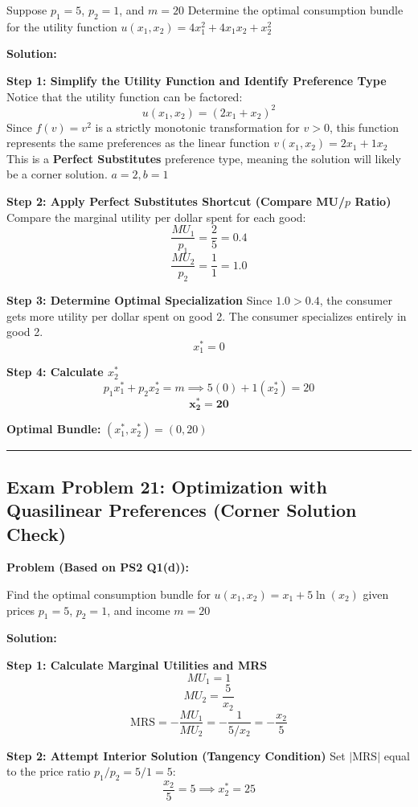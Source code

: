 \documentclass{article}
\begin{document}
Suppose $p_1 = 5$, $p_2 = 1$, and $m = 20$ Determine the optimal consumption bundle for the utility function $u(x_1, x_2) = 4x_1^2 + 4x_1x_2 + x_2^2$

\textbf{Solution:}

\textbf{Step 1: Simplify the Utility Function and Identify Preference Type}
Notice that the utility function can be factored:
\[ u(x_1, x_2) = (2x_1 + x_2)^2 \]
Since $f(v) = v^2$ is a strictly monotonic transformation for $v > 0$, this function represents the same preferences as the linear function $v(x_1, x_2) = 2x_1 + 1x_2$ This is a \textbf{Perfect Substitutes} preference type, meaning the solution will likely be a corner solution. $a=2, b=1$

\textbf{Step 2: Apply Perfect Substitutes Shortcut (Compare MU/$p$ Ratio)}
Compare the marginal utility per dollar spent for each good:
\[ \frac{MU_1}{p_1} = \frac{2}{5} = 0.4 \]
\[ \frac{MU_2}{p_2} = \frac{1}{1} = 1.0 \]

\textbf{Step 3: Determine Optimal Specialization}
Since $1.0 > 0.4$, the consumer gets more utility per dollar spent on good 2. The consumer specializes entirely in good 2.
\[ x_1^* = 0 \]

\textbf{Step 4: Calculate $x_2^*$}
\[ p_1 x_1^* + p_2 x_2^* = m \implies 5(0) + 1(x_2^*) = 20 \]
\[ \boldsymbol{x_2^* = 20} \]

\textbf{Optimal Bundle:} $(x_1^*, x_2^*) = (0, 20)$

\bigskip\noindent\rule{\linewidth}{0.4pt}\bigskip

\subsection*{\textbf{Exam Problem 21: Optimization with Quasilinear Preferences (Corner Solution Check)}}

\textbf{Problem (Based on PS2 Q1(d)):}

Find the optimal consumption bundle for $u(x_1, x_2) = x_1 + 5 \ln(x_2)$ given prices $p_1=5$, $p_2=1$, and income $m=20$

\textbf{Solution:}

\textbf{Step 1: Calculate Marginal Utilities and MRS}
\[ MU_1 = 1 \]
\[ MU_2 = \frac{5}{x_2} \]
\[ \text{MRS} = -\frac{MU_1}{MU_2} = -\frac{1}{5/x_2} = -\frac{x_2}{5} \]

\textbf{Step 2: Attempt Interior Solution (Tangency Condition)}
Set $|\text{MRS}|$ equal to the price ratio $p_1/p_2 = 5/1 = 5$:
\[ \frac{x_2}{5} = 5 \implies x_2^* = 25 \]
\end{document}
